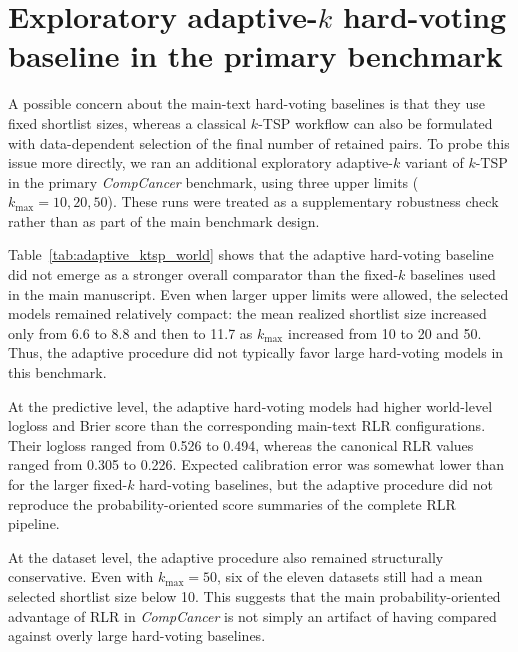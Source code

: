 \documentclass[11pt, a4paper]{article}
\begin{document}
\section{Exploratory adaptive-$k$ hard-voting baseline in the primary benchmark}

A possible concern about the main-text hard-voting baselines is that they use fixed shortlist sizes, whereas a classical $k$-TSP workflow can also be formulated with data-dependent selection of the final number of retained pairs. To probe this issue more directly, we ran an additional exploratory adaptive-$k$ variant of $k$-TSP in the primary \emph{CompCancer} benchmark, using three upper limits ($k_{\max}=10,20,50$). These runs were treated as a supplementary robustness check rather than as part of the main benchmark design.

Table~\ref{tab:adaptive_ktsp_world} shows that the adaptive hard-voting baseline did not emerge as a stronger overall comparator than the fixed-$k$ baselines used in the main manuscript. Even when larger upper limits were allowed, the selected models remained relatively compact: the mean realized shortlist size increased only from 6.6 to 8.8 and then to 11.7 as $k_{\max}$ increased from 10 to 20 and 50. Thus, the adaptive procedure did not typically favor large hard-voting models in this benchmark.

At the predictive level, the adaptive hard-voting models had higher world-level logloss and Brier score than the corresponding main-text RLR configurations. Their logloss ranged from 0.526 to 0.494, whereas the canonical RLR values ranged from 0.305 to 0.226. Expected calibration error was somewhat lower than for the larger fixed-$k$ hard-voting baselines, but the adaptive procedure did not reproduce the probability-oriented score summaries of the complete RLR pipeline.

At the dataset level, the adaptive procedure also remained structurally conservative. Even with $k_{\max}=50$, six of the eleven datasets still had a mean selected shortlist size below 10. This suggests that the main probability-oriented advantage of RLR in \emph{CompCancer} is not simply an artifact of having compared against overly large hard-voting baselines.
\end{document}
